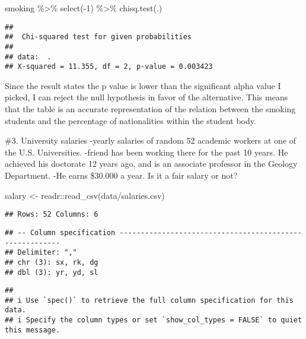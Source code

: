 \documentclass[
]{article}
\newenvironment{Shaded}{\begin{snugshade}}{\end{snugshade}}
\newcommand{\DecValTok}[1]{\textcolor[rgb]{0.00,0.00,0.81}{#1}}
\newcommand{\FunctionTok}[1]{\textcolor[rgb]{0.00,0.00,0.00}{#1}}
\newcommand{\NormalTok}[1]{#1}
\newcommand{\OtherTok}[1]{\textcolor[rgb]{0.56,0.35,0.01}{#1}}
\newcommand{\SpecialCharTok}[1]{\textcolor[rgb]{0.00,0.00,0.00}{#1}}
\newcommand{\StringTok}[1]{\textcolor[rgb]{0.31,0.60,0.02}{#1}}
\begin{document}
\begin{Shaded}
\begin{Highlighting}[]
\NormalTok{smoking }\SpecialCharTok{\%\textgreater{}\%} \FunctionTok{select}\NormalTok{(}\SpecialCharTok{{-}}\DecValTok{1}\NormalTok{) }\SpecialCharTok{\%\textgreater{}\%}
\FunctionTok{chisq.test}\NormalTok{(.)}
\end{Highlighting}
\end{Shaded}

\begin{verbatim}
## 
##  Chi-squared test for given probabilities
## 
## data:  .
## X-squared = 11.355, df = 2, p-value = 0.003423
\end{verbatim}

Since the result states the p value is lower than the significant alpha
value I picked, I can reject the null hypothesis in favor of the
alternative. This means that the table is an accurate representation of
the relation between the smoking students and the percentage of
nationalities within the student body.

\#3. University salaries -yearly salaries of random 52 academic workers
at one of the U.S. Universities. -friend has been working there for the
past 10 years. He achieved his doctorate 12 years ago, and is an
associate professor in the Geology Department. -He earns \$30.000 a
year. Is it a fair salary or not?

\begin{Shaded}
\begin{Highlighting}[]
\NormalTok{salary }\OtherTok{\textless{}{-}}\NormalTok{ readr}\SpecialCharTok{::}\FunctionTok{read\_csv}\NormalTok{(}\StringTok{\textquotesingle{}data/salaries.csv\textquotesingle{}}\NormalTok{)}
\end{Highlighting}
\end{Shaded}

\begin{verbatim}
## Rows: 52 Columns: 6
\end{verbatim}

\begin{verbatim}
## -- Column specification --------------------------------------------------------
## Delimiter: ","
## chr (3): sx, rk, dg
## dbl (3): yr, yd, sl
\end{verbatim}

\begin{verbatim}
## 
## i Use `spec()` to retrieve the full column specification for this data.
## i Specify the column types or set `show_col_types = FALSE` to quiet this message.
\end{verbatim}
\end{document}
